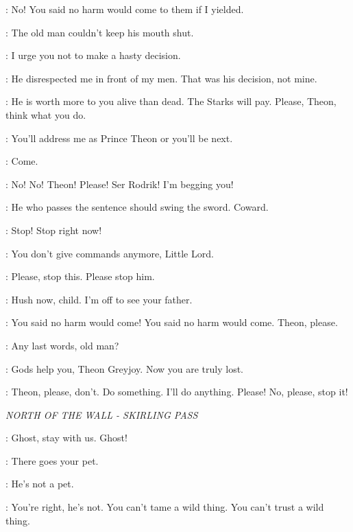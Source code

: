 \BRAN: No! You said no harm would come to them if I yielded. 

\THEON: The old man couldn't keep his mouth shut. 

\LUWIN: I urge you not to make a hasty decision. 

\THEON: He disrespected me in front of my men. That was his decision, not mine. 

\LUWIN: He is worth more to you alive than dead. The Starks will pay. Please, Theon, think what you do. 

\THEON:  You'll address me as Prince Theon or you'll be next. 

\DAGMER: Come. 


\BRAN: No! No! Theon! Please! Ser Rodrik! I'm begging you!


\RODRIK: He who passes the sentence should swing the sword. Coward. 


\BRAN: Stop! Stop right now! 

\THEON: You don't give commands anymore, Little Lord. 

\BRAN: Please, stop this. Please stop him. 

\RODRIK:  Hush now, child. I'm off to see your father. 

\BRAN: You said no harm would come! You said no harm would come. Theon, please. 

\THEON: Any last words, old man? 

\RODRIK: Gods help you, Theon Greyjoy. Now you are truly lost. 

\BRAN: Theon, please, don't.  Do something.  I'll do anything. Please! No, please, stop it! 



\scene

\textit{NORTH OF THE WALL - SKIRLING PASS}


\JON: Ghost, stay with us. Ghost! 

\HALFHAND: There goes your pet. 

\JON: He's not a pet. 

\HALFHAND: You're right, he's not. You can't tame a wild thing. You can't trust a wild thing. 

